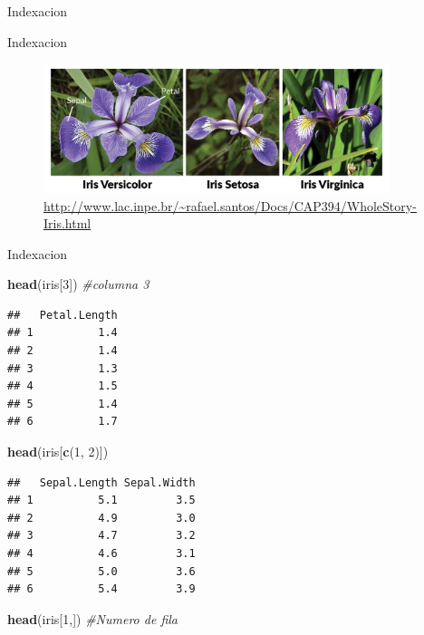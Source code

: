 \documentclass[
  ignorenonframetext,
]{beamer}
\newenvironment{Shaded}{\begin{snugshade}}{\end{snugshade}}
\newcommand{\CommentTok}[1]{\textcolor[rgb]{0.56,0.35,0.01}{\textit{#1}}}
\newcommand{\DecValTok}[1]{\textcolor[rgb]{0.00,0.00,0.81}{#1}}
\newcommand{\FunctionTok}[1]{\textcolor[rgb]{0.13,0.29,0.53}{\textbf{#1}}}
\newcommand{\NormalTok}[1]{#1}
\begin{document}
\begin{frame}[fragile]{Indexacion}
\begin{block}{Indexacion}
\protect\hypertarget{indexacion-1}{}
\begin{figure}
\hypertarget{id}{%
\centering
\includegraphics[width=0.9\textwidth,height=0.9\textheight]{Imagenes/iris.png}
\caption{\url{http://www.lac.inpe.br/~rafael.santos/Docs/CAP394/WholeStory-Iris.html}}\label{id}
}
\end{figure}
\end{block}

\begin{block}{Indexacion}
\protect\hypertarget{indexacion-2}{}
\begin{Shaded}
\begin{Highlighting}[]
\FunctionTok{head}\NormalTok{(iris[}\DecValTok{3}\NormalTok{]) }\CommentTok{\#columna 3}
\end{Highlighting}
\end{Shaded}

\begin{verbatim}
##   Petal.Length
## 1          1.4
## 2          1.4
## 3          1.3
## 4          1.5
## 5          1.4
## 6          1.7
\end{verbatim}

\begin{Shaded}
\begin{Highlighting}[]
\FunctionTok{head}\NormalTok{(iris[}\FunctionTok{c}\NormalTok{(}\DecValTok{1}\NormalTok{, }\DecValTok{2}\NormalTok{)])}
\end{Highlighting}
\end{Shaded}

\begin{verbatim}
##   Sepal.Length Sepal.Width
## 1          5.1         3.5
## 2          4.9         3.0
## 3          4.7         3.2
## 4          4.6         3.1
## 5          5.0         3.6
## 6          5.4         3.9
\end{verbatim}

\begin{Shaded}
\begin{Highlighting}[]
\FunctionTok{head}\NormalTok{(iris[}\DecValTok{1}\NormalTok{,]) }\CommentTok{\#Numero de fila}
\end{Highlighting}
\end{Shaded}


\end{block}
\end{frame}
\end{document}
